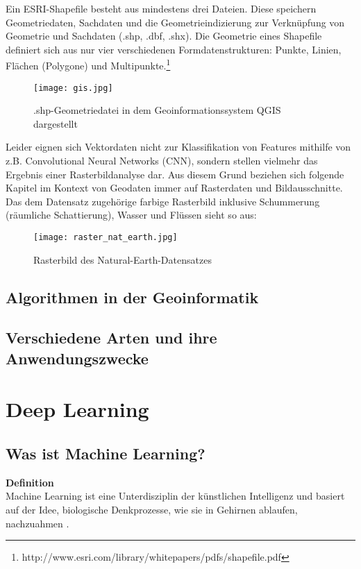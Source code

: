 \documentclass[11pt,ceqn]{book}
\begin{document}
Ein ESRI-Shapefile besteht aus mindestens drei Dateien. Diese speichern Geometriedaten, Sachdaten und die Geometrieindizierung zur Verknüpfung von Geometrie und Sachdaten (.shp, .dbf, .shx). Die Geometrie eines Shapefile definiert sich aus nur vier verschiedenen Formdatenstrukturen: Punkte, Linien, Flächen (Polygone) und Multipunkte.\footnote{http://www.esri.com/library/whitepapers/pdfs/shapefile.pdf}

\begin{figure}[H]
\centering
\texttt{[image: gis.jpg]}
\caption{.shp-Geometriedatei in dem Geoinformationssystem QGIS dargestellt \protect\footnotemark}
\end{figure}
Leider eignen sich Vektordaten nicht zur Klassifikation von Features mithilfe von z.B. Convolutional Neural Networks (CNN), sondern stellen vielmehr das Ergebnis einer Rasterbildanalyse dar. Aus diesem Grund beziehen sich folgende Kapitel im Kontext von Geodaten immer auf Rasterdaten und Bildausschnitte.
\newline
Das dem Datensatz zugehörige farbige Rasterbild inklusive Schummerung (räumliche Schattierung), Wasser und Flüssen sieht so aus:

\begin{figure}[H]
\centering
\texttt{[image: raster\_nat\_earth.jpg]}
\caption{Rasterbild des Natural-Earth-Datensatzes \protect\footnotemark}
\end{figure}

\section{Algorithmen in der Geoinformatik}
\section{Verschiedene Arten und ihre Anwendungszwecke}


\chapter{Deep Learning}

\section{Was ist Machine Learning?}
\textbf{Definition}\\
Machine Learning ist eine Unterdisziplin der künstlichen Intelligenz und basiert auf der Idee, biologische Denkprozesse, wie sie in Gehirnen ablaufen, nachzuahmen \cite{geofront}.
\end{document}
